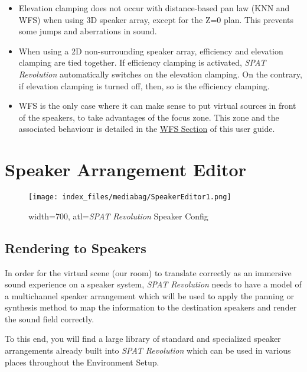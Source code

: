 \documentclass[
  letterpaper,
  DIV=11,
  numbers=noendperiod]{scrreport}
\providecommand{\tightlist}{%
  \setlength{\itemsep}{0pt}\setlength{\parskip}{0pt}}\usepackage{longtable,booktabs,array}
\begin{document}
\begin{itemize}
\tightlist
\item
  Elevation clamping does not occur with distance-based pan law (KNN and
  WFS) when using 3D speaker array, except for the Z=0 plan. This
  prevents some jumps and aberrations in sound.
\item
  When using a 2D non-surrounding speaker array, efficiency and
  elevation clamping are tied together. If efficiency clamping is
  activated, \emph{SPAT Revolution} automatically switches on the
  elevation clamping. On the contrary, if elevation clamping is turned
  off, then, so is the efficiency clamping.
\item
  WFS is the only case where it can make sense to put virtual sources in
  front of the speakers, to take advantages of the focus zone. This zone
  and the associated behaviour is detailed in the
  \href{Spatialisation_Technology_WFS.md}{WFS Section} of this user
  guide.
\end{itemize}

\hypertarget{speaker-arrangement-editor}{%
\chapter{Speaker Arrangement Editor}\label{speaker-arrangement-editor}}

\begin{figure}

{\centering \texttt{[image: index\_files/mediabag/SpeakerEditor1.png]}

}

\caption{width=700, atl=\emph{SPAT Revolution} Speaker Config}

\end{figure}

\hypertarget{rendering-to-speakers}{%
\section{Rendering to Speakers}\label{rendering-to-speakers}}

In order for the virtual scene (our room) to translate correctly as an
immersive sound experience on a speaker system, \emph{SPAT Revolution}
needs to have a model of a multichannel speaker arrangement which will
be used to apply the panning or synthesis method to map the information
to the destination speakers and render the sound field correctly.

To this end, you will find a large library of standard and specialized
speaker arrangements already built into \emph{SPAT Revolution} which can
be used in various places throughout the Environment Setup.
\end{document}
